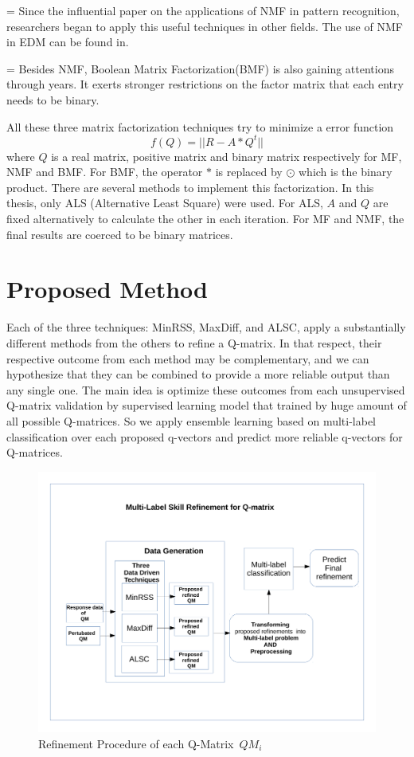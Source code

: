 \documentclass[11pt]{article}
\begin{document}
\parskip = \baselineskip
Since the influential paper on the applications of NMF in pattern  recognition\cite{lee1999learning}, researchers began to apply this useful techniques in other fields. The use of NMF in EDM can be found in\cite{desmarais2012mapping}.

\parskip = \baselineskip
Besides NMF, Boolean Matrix Factorization(BMF) is also gaining attentions through years. It exerts stronger restrictions on the factor matrix that each entry needs to be binary.

All these three matrix factorization techniques try to minimize a error function
$$ f(Q)=||R-A*Q^t||$$
where $Q$ is a real matrix, positive matrix and binary matrix respectively for MF, NMF and BMF. For BMF, the operator $*$ is replaced by $\odot$ which is the binary product. There are several methods to implement this factorization. In this thesis, only ALS (Alternative Least Square) were used. For ALS, $A$ and $Q$ are fixed alternatively to calculate the other in each iteration. For MF and NMF, the final results are coerced to be binary matrices. 




\section{Proposed Method}

 Each of the three techniques: MinRSS, MaxDiff, and ALSC, apply a substantially different methods from the others to refine a Q-matrix. In that respect, their respective outcome from each method may be complementary, and we can hypothesize that they can be combined to provide a more reliable output than any single one. The main idea is optimize these outcomes from each unsupervised Q-matrix validation by supervised learning model that trained by huge amount of all possible Q-matrices. So we apply ensemble learning based on multi-label classification over each proposed q-vectors and predict more reliable q-vectors for Q-matrices. 
 
 \begin{figure}\label{fig:RP}
  \centering
    \includegraphics[width=100 mm ,scale=0.5]{graph/RP.pdf}
  \caption{Refinement Procedure of each Q-Matrix~$QM_i$ }
\end{figure} 
\end{document}
